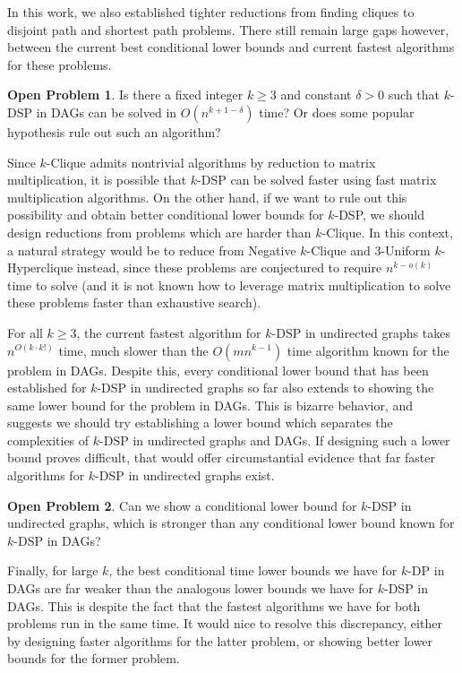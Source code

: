 \documentclass[11pt]{article}
\theoremstyle{definition}
\newtheorem{open}{Open Problem}
\begin{document}
In this work, we also established tighter reductions from finding cliques to disjoint path and shortest path problems.
There still remain large gaps however, between the current best conditional lower bounds and current fastest algorithms for these problems.

\begin{open}
    Is there a fixed integer $k\ge 3$ and constant $\delta > 0$ such that \textsf{$k$-DSP} in DAGs can be solved in $O(n^{k+1-\delta})$ time? 
    Or does some popular hypothesis rule out such an algorithm?
\end{open}

Since \textsf{$k$-Clique} admits nontrivial algorithms by reduction to matrix multiplication, it is possible that \textsf{$k$-DSP} can be solved faster using fast matrix multiplication algorithms.
On the other hand, if we want to rule out this possibility and obtain better conditional lower bounds for \textsf{$k$-DSP}, we should design reductions from problems which are harder than \textsf{$k$-Clique}.
In this context, a natural strategy would be to reduce from \textsf{Negative $k$-Clique} and \textsf{3-Uniform $k$-Hyperclique} instead, since these problems are conjectured to require $n^{k-o(k)}$ time to solve (and it is not known how to leverage matrix multiplication to solve these problems faster than exhaustive search).

For all $k\ge 3$, the current fastest algorithm for \textsf{$k$-DSP} in undirected graphs takes $n^{O(k\cdot k!)}$ time, much slower than the $O(mn^{k-1})$ time algorithm known for the problem in DAGs.
Despite this, every conditional lower bound that has been established for \textsf{$k$-DSP} in undirected graphs so far also extends to showing the same lower bound for the problem in DAGs.
This is bizarre behavior, and suggests we should try establishing a lower bound which separates the complexities of \textsf{$k$-DSP} in undirected graphs and DAGs.
If designing such a lower bound proves difficult, that would offer circumstantial evidence that far faster algorithms for \textsf{$k$-DSP} in undirected graphs exist.

\begin{open}
    Can we show a conditional lower bound for \textsf{$k$-DSP} in undirected graphs, which is stronger than any conditional lower bound known for \textsf{$k$-DSP} in DAGs? 
\end{open}

Finally, for large $k$, the best conditional time lower bounds we have for \textsf{$k$-DP} in DAGs are far weaker than the analogous lower bounds we have for \textsf{$k$-DSP} in DAGs.
This is despite the fact that the fastest algorithms we have for both problems run in the same time.
It would nice to resolve this discrepancy, either by designing faster algorithms for the latter problem, or showing better lower bounds for the former problem.
\end{document}
